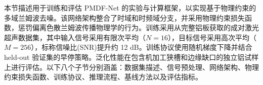 本节描述用于训练和评估 PMDF-Net 的实验与计算框架，以实现基于物理约束的多域兰姆波去噪。该网络架构整合了时域和时频域分支，并采用物理约束损失函数，惩罚偏离色散兰姆波传播物理学的行为。训练采用从完整铝板获取的成对激光超声数据集，其中输入信号采用有限次平均（$N = 16$），目标信号采用高次平均（$M = 256$），标称信噪比(SNR)提升约 12 dB。训练协议使用随机梯度下降并结合 held-out 验证集的早停策略。泛化性能在包含机加工狭槽和边缘缺口的独立铝试样上进行评估。以下八个子节分别涵盖：数据集描述、信号预处理、网络架构、物理约束损失函数、训练协议、推理流程、基线方法以及评估指标。